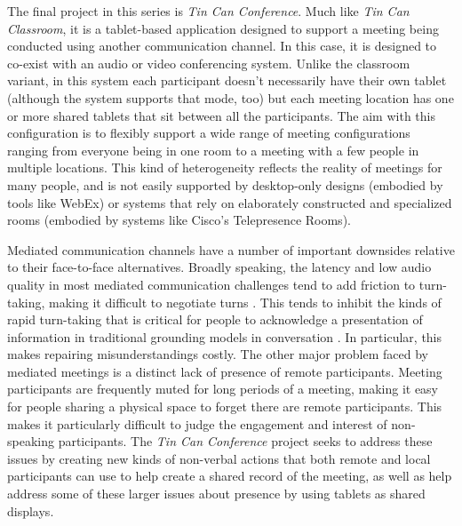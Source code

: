 \documentclass{tufte-handout}
\begin{document}
The final project in this series is \emph{Tin Can Conference}. Much like \emph{Tin Can Classroom}, it is a tablet-based application designed to support a meeting being conducted using another communication channel. In this case, it is designed to co-exist with an audio or video conferencing system. Unlike the classroom variant, in this system each participant doesn't necessarily have their own tablet (although the system supports that mode, too) but each meeting location has one or more shared tablets that sit between all the participants. The aim with this configuration is to flexibly support a wide range of meeting configurations ranging from everyone being in one room to a meeting with a few people in multiple locations. This kind of heterogeneity reflects the reality of meetings for many people, and is not easily supported by desktop-only designs (embodied by tools like WebEx) or systems that rely on elaborately constructed and specialized rooms (embodied by systems like Cisco's Telepresence Rooms).

Mediated communication channels have a number of important downsides relative to their face-to-face alternatives. Broadly speaking, the latency and low audio quality in most mediated communication challenges tend to add friction to turn-taking, making it difficult to negotiate turns \citep{Brennan:1991wk}. This tends to inhibit the kinds of rapid turn-taking that is critical for people to acknowledge a presentation of information in traditional grounding models in conversation \citep{Clark:1989uc}. In particular, this makes repairing misunderstandings costly. The other major problem faced by mediated meetings is a distinct lack of presence of remote participants. Meeting participants are frequently muted for long periods of a meeting, making it easy for people sharing a physical space to forget there are remote participants. This makes it particularly difficult to judge the engagement and interest of non-speaking participants. The \emph{Tin Can Conference} project seeks to address these issues by creating new kinds of non-verbal actions that both remote and local participants can use to help create a shared record of the meeting, as well as help address some of these larger issues about presence by using tablets as shared displays.


\end{document}
